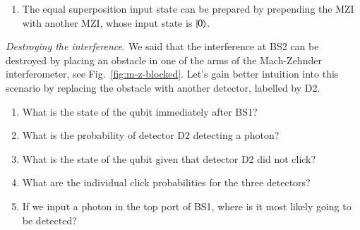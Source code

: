 \begin{solution}
\begin{enumerate}[label=(\alph*)]
\begin{equation*}
\begin{pmatrix}
            1 \\ 1
        \end{pmatrix} = \frac{1}{\sqrt{2}}\begin{pmatrix}
            -1 \\ 1
        \end{pmatrix} = \ket{-},
    \end{equation*}
    up to a global phase. The output state is also an equal superposition meaning both detectors have an equal probability of detecting the photon.
    \item The equal superposition input state can be prepared by prepending the MZI with another MZI, whose input state is $\left| 0 \right\rangle$.
\end{enumerate}
\end{solution}

\begin{exercise}
\emph{Destroying the interference.}
We said that the interference at BS2 can be destroyed by placing an obstacle in one of the arms of the Mach-Zehnder interferometer, see Fig.~\ref{fig:m-z-blocked}. Let's gain better intuition into this scenario by replacing the obstacle with another detector, labelled by D2.
\begin{enumerate}[label=(\alph*)]
    \item What is the state of the qubit immediately after BS1?
    \item What is the probability of detector D2 detecting a photon?
    \item What is the state of the qubit given that detector D2 did not click?
    \item What are the individual click probabilities for the three detectors?
    \item If we input a photon in the top port of BS1, where is it most likely going to be detected?
\end{enumerate} 
\end{exercise}
